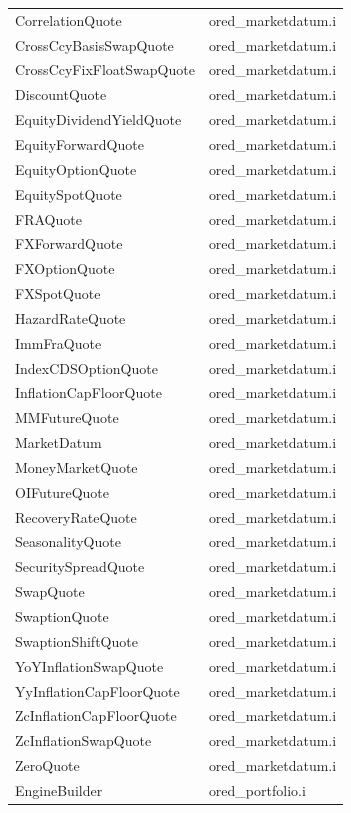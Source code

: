 \documentclass[12pt, a4paper]{report}
\begin{document}
\begin{appendix}
{\begin{longtable}{|l|l|}
CorrelationQuote & ored\_marketdatum.i \\
CrossCcyBasisSwapQuote & ored\_marketdatum.i \\
CrossCcyFixFloatSwapQuote & ored\_marketdatum.i \\
DiscountQuote & ored\_marketdatum.i \\
EquityDividendYieldQuote & ored\_marketdatum.i \\
EquityForwardQuote & ored\_marketdatum.i \\
EquityOptionQuote & ored\_marketdatum.i \\
EquitySpotQuote & ored\_marketdatum.i \\
FRAQuote & ored\_marketdatum.i \\
FXForwardQuote & ored\_marketdatum.i \\
FXOptionQuote & ored\_marketdatum.i \\
FXSpotQuote & ored\_marketdatum.i \\
HazardRateQuote & ored\_marketdatum.i \\
ImmFraQuote & ored\_marketdatum.i \\
IndexCDSOptionQuote & ored\_marketdatum.i \\
InflationCapFloorQuote & ored\_marketdatum.i \\
MMFutureQuote & ored\_marketdatum.i \\
MarketDatum & ored\_marketdatum.i \\
MoneyMarketQuote & ored\_marketdatum.i \\
OIFutureQuote & ored\_marketdatum.i \\
RecoveryRateQuote & ored\_marketdatum.i \\
SeasonalityQuote & ored\_marketdatum.i \\
SecuritySpreadQuote & ored\_marketdatum.i \\
SwapQuote & ored\_marketdatum.i \\
SwaptionQuote & ored\_marketdatum.i \\
SwaptionShiftQuote & ored\_marketdatum.i \\
YoYInflationSwapQuote & ored\_marketdatum.i \\
YyInflationCapFloorQuote & ored\_marketdatum.i \\
ZcInflationCapFloorQuote & ored\_marketdatum.i \\
ZcInflationSwapQuote & ored\_marketdatum.i \\
ZeroQuote & ored\_marketdatum.i \\
EngineBuilder & ored\_portfolio.i \\

\end{longtable}}
\end{appendix}
\end{document}
